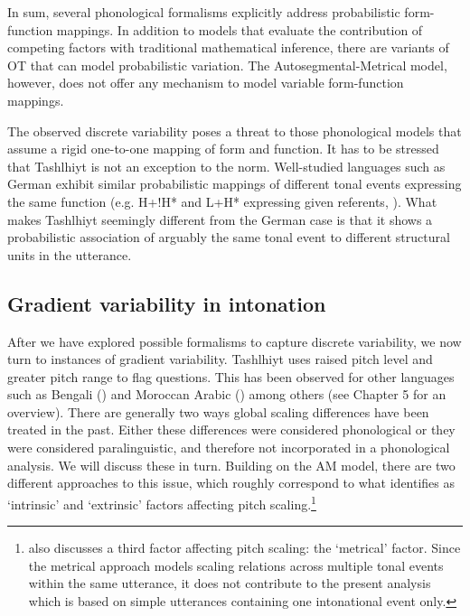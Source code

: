 In sum, several phonological formalisms explicitly address probabilistic form-function mappings. In addition to models that evaluate the contribution of competing factors with traditional mathematical inference, there are variants of OT that can model probabilistic variation. The Autosegmental-Metrical model, however, does not offer any mechanism to model variable form-function mappings.

The observed discrete variability poses a threat to those phonological models that assume a rigid one-to-one mapping of form and function. It has to be stressed that Tashlhiyt is not an exception to the norm. Well-studied languages such as German exhibit similar probabilistic mappings of different tonal events expressing the same function (e.g. H+!H* and L+H* expressing given referents, \citealt{Baumann.etal2015}). What makes Tashlhiyt seemingly different from the German case is that it shows a probabilistic association of arguably the same tonal event to different structural units in the utterance.

\subsection{Gradient variability in intonation}  
After we have explored possible formalisms to capture discrete variability, we now turn to instances of gradient variability. Tashlhiyt uses raised pitch level and greater pitch range to flag questions. This has been observed for other languages such as Bengali (\citealt{HayesLahiri1991}) and Moroccan Arabic (\citealt{Benkirane1998}) among others (see Chapter 5 for an overview). There are generally two ways global scaling differences have been treated in the past. Either these differences were considered phonological or they were considered paralinguistic, and therefore not incorporated in a phonological analysis. We will discuss these in turn. Building on the AM model, there are two different approaches to this issue, which roughly correspond to what \citet{Ladd2008} identifies as ‘intrinsic’ and ‘extrinsic’ factors affecting pitch scaling.\footnote{\citet{Ladd2008} also discusses a third factor affecting pitch scaling: the ‘metrical’ factor. Since the metrical approach models scaling relations across multiple tonal events within the same utterance, it does not contribute to the present analysis which is based on simple utterances containing one intonational event only.} 


